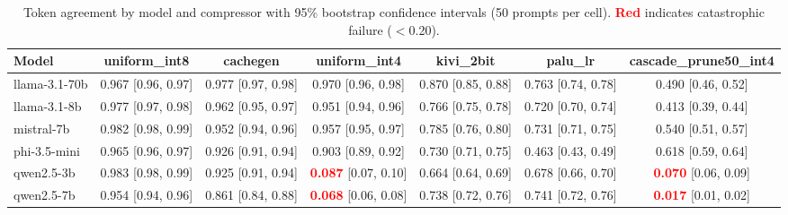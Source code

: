 \begin{table}[t]
\centering
\caption{Token agreement by model and compressor with 95\% bootstrap confidence intervals (50 prompts per cell). \textcolor{red}{\textbf{Red}} indicates catastrophic failure ($<$0.20).}
\label{tab:model_sensitivity_ci}
\small
\begin{tabular}{lcccccc}
\toprule
\textbf{Model} & \textbf{uniform\_int8} & \textbf{cachegen} & \textbf{uniform\_int4} & \textbf{kivi\_2bit} & \textbf{palu\_lr} & \textbf{cascade\_prune50\_int4} \\
\midrule
  llama-3.1-70b & 0.967 \tiny{[0.96, 0.97]} & 0.977 \tiny{[0.97, 0.98]} & 0.970 \tiny{[0.96, 0.98]} & 0.870 \tiny{[0.85, 0.88]} & 0.763 \tiny{[0.74, 0.78]} & 0.490 \tiny{[0.46, 0.52]} \\
  llama-3.1-8b & 0.977 \tiny{[0.97, 0.98]} & 0.962 \tiny{[0.95, 0.97]} & 0.951 \tiny{[0.94, 0.96]} & 0.766 \tiny{[0.75, 0.78]} & 0.720 \tiny{[0.70, 0.74]} & 0.413 \tiny{[0.39, 0.44]} \\
  mistral-7b & 0.982 \tiny{[0.98, 0.99]} & 0.952 \tiny{[0.94, 0.96]} & 0.957 \tiny{[0.95, 0.97]} & 0.785 \tiny{[0.76, 0.80]} & 0.731 \tiny{[0.71, 0.75]} & 0.540 \tiny{[0.51, 0.57]} \\
  phi-3.5-mini & 0.965 \tiny{[0.96, 0.97]} & 0.926 \tiny{[0.91, 0.94]} & 0.903 \tiny{[0.89, 0.92]} & 0.730 \tiny{[0.71, 0.75]} & 0.463 \tiny{[0.43, 0.49]} & 0.618 \tiny{[0.59, 0.64]} \\
  qwen2.5-3b & 0.983 \tiny{[0.98, 0.99]} & 0.925 \tiny{[0.91, 0.94]} & \textcolor{red}{\textbf{0.087}} \tiny{[0.07, 0.10]} & 0.664 \tiny{[0.64, 0.69]} & 0.678 \tiny{[0.66, 0.70]} & \textcolor{red}{\textbf{0.070}} \tiny{[0.06, 0.09]} \\
  qwen2.5-7b & 0.954 \tiny{[0.94, 0.96]} & 0.861 \tiny{[0.84, 0.88]} & \textcolor{red}{\textbf{0.068}} \tiny{[0.06, 0.08]} & 0.738 \tiny{[0.72, 0.76]} & 0.741 \tiny{[0.72, 0.76]} & \textcolor{red}{\textbf{0.017}} \tiny{[0.01, 0.02]} \\
\bottomrule
\end{tabular}
\end{table}
